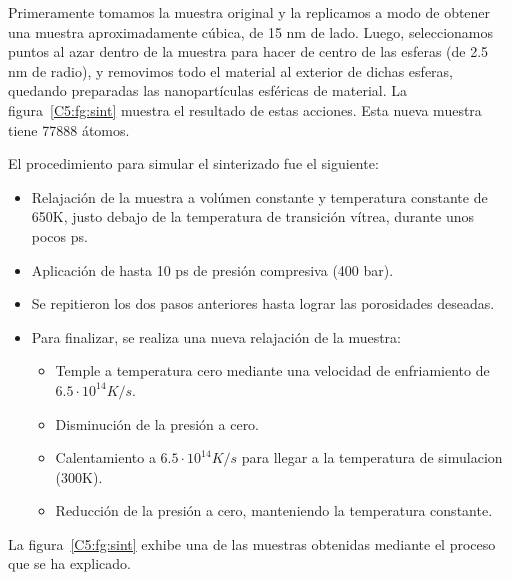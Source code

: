 Primeramente tomamos la muestra original y la replicamos a modo de obtener una muestra aproximadamente cúbica, de 15 nm de lado. 
Luego, seleccionamos puntos
al azar dentro de la muestra para hacer de centro de las esferas (de 2.5 nm de radio), y removimos todo el material al exterior de dichas esferas,
quedando preparadas las nanopartículas esféricas de material. La figura~\ref{C5:fg:sint}  muestra el resultado de estas
acciones. Esta nueva muestra tiene 77888 átomos.

El procedimiento para simular el sinterizado fue el siguiente:

\begin{itemize}
 \item Relajación de la muestra a volúmen constante y temperatura constante de 650K, justo debajo de la temperatura
de transición vítrea, durante unos pocos ps.
 \item Aplicación de hasta 10 ps de presión compresiva (400 bar).
 \item Se repitieron los dos pasos anteriores hasta lograr las porosidades deseadas.
 \item Para finalizar, se realiza una nueva relajación de la muestra:
 \begin{itemize}
  \item Temple a temperatura cero mediante una velocidad de enfriamiento de $6.5 \cdot 10^{14} K/s$.
  \item Disminución de la presión a cero.
  \item Calentamiento a $6.5 \cdot 10^{14} K/s$ para llegar a la temperatura de simulacion (300K).
  \item Reducción de la presión a cero, manteniendo la temperatura constante.
 \end{itemize}
\end{itemize}

La figura~\ref{C5:fg:sint}  exhibe una de las muestras obtenidas mediante el proceso que se ha explicado.


